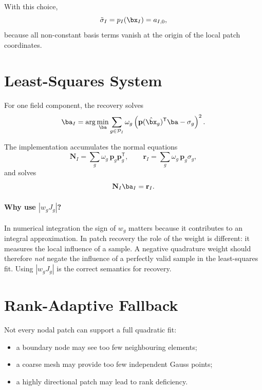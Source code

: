 With this choice,
\begin{equation}
  \tilde{\sigma}_I = p_I(\bx_I) = a_{I,0},
\end{equation}
because all non-constant basis terms vanish at the origin of the local patch
coordinates.


\section{Least-Squares System}
\label{sec:patch_lsq}

For one field component, the recovery solves
\begin{equation}
  \ba_I
  = \arg\min_{\ba}
    \sum_{g \in \mathcal{P}_I}
    \omega_g
    \left(
      \mathbf{p}(\hat{\bx}_g)^{\mathsf{T}} \ba - \sigma_g
    \right)^2.
\end{equation}

The implementation accumulates the normal equations
\begin{equation}
  \mathbf{N}_I = \sum_g \omega_g\, \mathbf{p}_g \mathbf{p}_g^{\mathsf{T}},
  \qquad
  \mathbf{r}_I = \sum_g \omega_g\, \mathbf{p}_g \sigma_g,
\end{equation}
and solves
\begin{equation}
  \mathbf{N}_I \ba_I = \mathbf{r}_I.
\end{equation}

\paragraph{Why use \texorpdfstring{$|w_g J_g|$}{|wJ|}?}
In numerical integration the sign of $w_g$ matters because it contributes to
an integral approximation.  In patch recovery the role of the weight is
different: it measures the local influence of a sample.  A negative
quadrature weight should therefore \emph{not} negate the influence of a
perfectly valid sample in the least-squares fit.  Using $|w_g J_g|$ is the
correct semantics for recovery.


\section{Rank-Adaptive Fallback}
\label{sec:patch_rank}

Not every nodal patch can support a full quadratic fit:
\begin{itemize}[nosep]
  \item a boundary node may see too few neighbouring elements;
  \item a coarse mesh may provide too few independent Gauss points;
  \item a highly directional patch may lead to rank deficiency.
\end{itemize}

